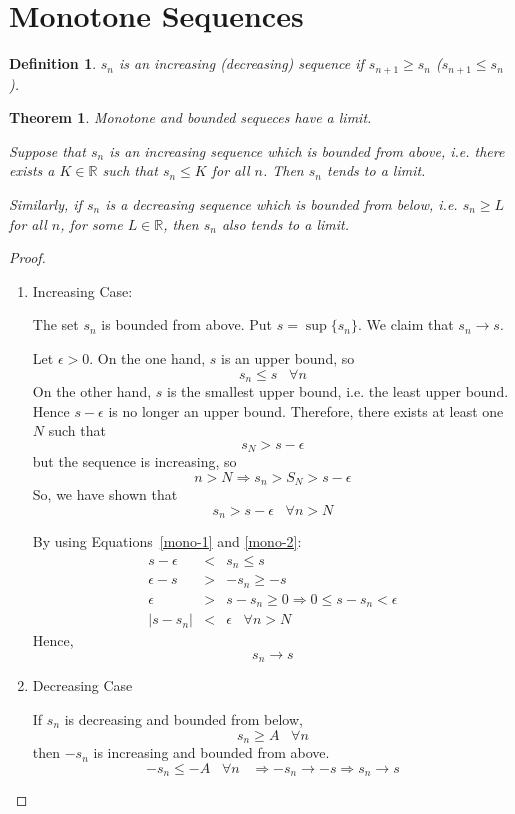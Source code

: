 \documentclass[12pt]{scrbook}
\newtheorem*{definition}{Definition}
\newtheorem{theorem}{Theorem}[section]
\begin{document}
\section{Monotone Sequences}

\begin{definition}
$s_n$ is an increasing (decreasing) sequence if $s_{n+1} \ge s_n$ ($s_{n+1} \le s_n$).
\end{definition}

\begin{theorem}
Monotone and bounded sequeces have a limit.

Suppose that $s_n$ is an increasing sequence which is bounded from above, i.e. there exists a $K \in \mathbb{R}$
such that $s_n \le K$ for all $n$.  Then $s_n$ tends to a limit.

Similarly, if $s_n$ is a decreasing sequence which is bounded from below, i.e. $s_n \ge L$ for all $n$, for some
$L \in \mathbb{R}$, then $s_n$ also tends to a limit.
\end{theorem}

\begin{proof}
\begin{enumerate}
\item Increasing Case:

The set $s_n$ is bounded from above.  Put $s = \sup\{s_n\}$.  We claim that $s_n \rightarrow s$.

Let $\epsilon > 0$.  On the one hand, $s$ is an upper bound, so
\begin{equation}
\label{mono-1}
s_n \le s \;\;\; \forall n
\end{equation}
On the other hand, $s$ is the smallest upper bound, i.e. the least upper bound.  Hence $s - \epsilon$ is no longer
an upper bound.  Therefore, there exists at least one $N$ such that 
\[ s_N > s - \epsilon \]
but the sequence is increasing, so
\[ n > N \Rightarrow s_n > S_N > s - \epsilon \]
So, we have shown that 
\begin{equation}
\label{mono-2}
s_n > s - \epsilon \;\;\; \forall n > N
\end{equation}

By using Equations~\ref{mono-1} and \ref{mono-2}:
\begin{eqnarray*}
s - \epsilon &<& s_n \le s  \\
\epsilon - s &>& -s_n \ge -s  \\
\epsilon &>& s - s_n \ge 0 \Rightarrow 0 \le s - s_n < \epsilon \\
|s - s_n| &<& \epsilon \;\;\; \forall n > N
\end{eqnarray*}
Hence, 
\[ s_n \rightarrow s \]

\item Decreasing Case

If $s_n$ is decreasing and bounded from below, 
\[ s_n \ge A \;\;\; \forall n \]
then $-s_n$ is increasing and bounded from above.  
\[ -s_n \le -A \;\;\; \forall n \;\;\; \Rightarrow -s_n \rightarrow -s \Rightarrow s_n \rightarrow s \]

\end{enumerate}
\end{proof}
\end{document}
